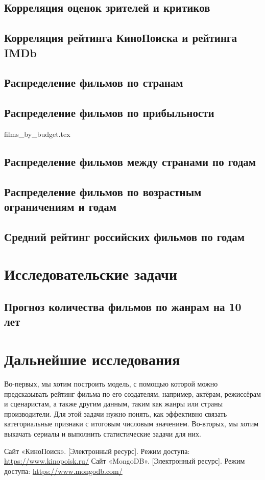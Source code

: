 \documentclass[conference]{IEEEtran}
\begin{document}
\subsection{Корреляция оценок зрителей и критиков}
\subsection{Корреляция рейтинга КиноПоиска и рейтинга IMDb}
\subsection{Распределение фильмов по странам}
\subsection{Распределение фильмов по прибыльности}

{films_by_budget.tex}

\subsection{Распределение фильмов между странами по годам}
\subsection{Распределение фильмов по возрастным ограничениям и годам}
\subsection{Средний рейтинг российских фильмов по годам}

\section{Исследовательские задачи}
\subsection{Прогноз количества фильмов по жанрам на 10 лет}

\section{Дальнейшие исследования}

Во-первых, мы хотим построить модель, с помощью которой можно предсказывать рейтинг фильма по его создателям, например, актёрам, режиссёрам и сценаристам, а также другим данным, таким как жанры или страны производители. Для этой задачи нужно понять, как эффективно связать категориальные признаки с итоговым числовым значением. Во-вторых, мы хотим выкачать сериалы и выполнить статистические задачи для них.

\begin{thebibliography}{00}
 Сайт «КиноПоиск». [Электронный ресурс]. Режим доступа: \url{https://www.kinopoisk.ru/}
 Сайт «MongoDB». [Электронный ресурс]. Режим доступа: \url{https://www.mongodb.com/}

\end{thebibliography}
\end{document}
